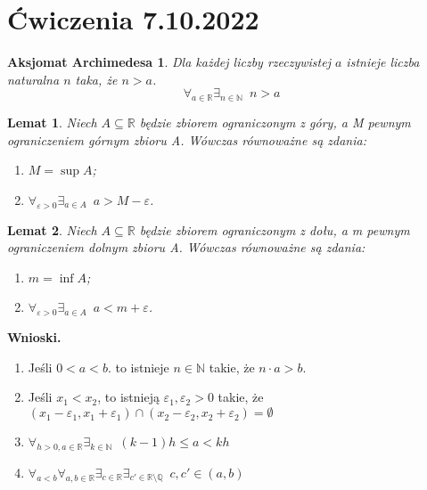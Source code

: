 \documentclass{article}
\newcommand{\R}{\mathbb{R}}
\newcommand{\N}{\mathbb{N}}
\newcommand{\Q}{\mathbb{Q}}
\newtheorem*{arch}{Aksjomat Archimedesa}
\newtheorem{lemma}{Lemat}
\begin{document}
%

                                            \section{Ćwiczenia 7.10.2022}

\begin{arch} %
Dla każdej liczby rzeczywistej $a$ istnieje liczba naturalna $n$ taka, że $n>a$.
    \begin{equation*}
        \forall_{a\in\R}\exists_{n\in\N}\enspace n>a
    \end{equation*}
\end{arch}

\begin{lemma} %
Niech $A\subseteq\R$ będzie zbiorem ograniczonym z góry, a M pewnym ograniczeniem górnym zbioru A.
Wówczas równoważne są zdania:
    \begin{enumerate}[label=(\roman*)]
        \item $M=\sup{A}$;
        \item $\forall_{\varepsilon>0}\exists_{a\in A}\enspace a>M-\varepsilon$.
    \end{enumerate}
\end{lemma}

\begin{lemma} %
Niech $A\subseteq\R$ będzie zbiorem ograniczonym z dołu, a m pewnym ograniczeniem dolnym zbioru A.
Wówczas równoważne są zdania:
    \begin{enumerate}[label=(\roman*)]
        \item $m=\inf{A}$;
        \item $\forall_{\varepsilon>0}\exists_{a\in A}\enspace a<m+\varepsilon$.
    \end{enumerate}
\end{lemma}

\noindent \textbf{Wnioski.} %
    \begin{enumerate}[label=(\Roman*)]
        \item Jeśli $0<a<b$. to istnieje $n\in\N$ takie, że $n\cdot a>b$.
        \item Jeśli $x_1<x_2$, to istnieją $\varepsilon_1,\varepsilon_2>0$ takie, że $(x_1-\varepsilon_1,x_1+\varepsilon_1)\cap(x_2-\varepsilon_2,x_2+\varepsilon_2)=\emptyset$
        \item $\forall_{h>0,a\in\R}\exists_{k\in\N} \enspace (k-1)h\le a<kh$
        \item $\forall_{a<b}\forall_{a,b\in\R}\exists_{c\in\R}\exists_{c'\in\R\setminus\Q} \enspace c,c'\in(a,b)$
    \end{enumerate}
\end{document}
